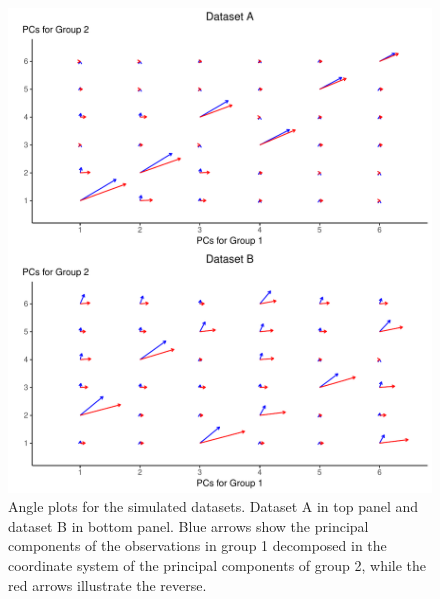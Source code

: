 \documentclass[a4paper,12pt]{article}
\begin{document}
\begin{figure}[H]
\center
\includegraphics[scale=0.8]{Figure3_v2.pdf}
\caption{Angle plots for the simulated datasets. Dataset A in top panel and dataset B in bottom panel. Blue arrows show the principal components of the observations in group 1 decomposed in the coordinate system of the principal components of group 2, while the red arrows illustrate the reverse.}
\label{plot.simAngle}
\end{figure}
\end{document}
